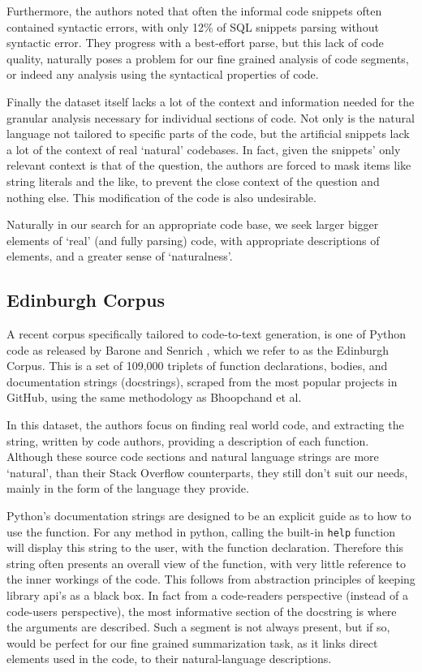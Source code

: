 Furthermore, the authors noted that often the informal code snippets often contained syntactic errors, with only 12\% of SQL snippets parsing without syntactic error. They progress with a best-effort parse, but this
 lack of code quality, naturally poses a problem for our fine grained analysis of code segments, or indeed any analysis using the syntactical properties of code.

Finally the dataset itself lacks a lot of the context and information needed for the granular analysis necessary for individual sections of code. Not only is the natural language not tailored to specific parts of the code, but the artificial snippets lack a lot of the context of real `natural' codebases. In fact, given the snippets' only relevant context is that of the question, the authors are forced to mask items like string literals and the like, to prevent the close context of the question and nothing else. This modification of the code is also undesirable.

Naturally in our search for an appropriate code base, we seek larger bigger elements of `real' (and fully parsing) code, with appropriate descriptions of elements, and a greater sense of `naturalness'.

\subsection{Edinburgh Corpus}

A recent corpus specifically tailored to code-to-text generation, is one of Python code as released by Barone and Senrich \cite{barone_parallel_2017}, which we refer to as the Edinburgh Corpus. 
This is a set of 109,000 triplets of function declarations, bodies, and documentation strings (docstrings), scraped from the most popular projects in GitHub, using the same methodology as Bhoopchand et al. 

In this dataset, the authors focus on finding real world code, and extracting the string, written by code authors, providing a description of each function.
Although these source code sections and natural language strings are more `natural', than their Stack Overflow counterparts, they still don't suit our needs, mainly in the form of the language they provide. 

Python's documentation strings are designed to be an explicit guide as to how to use the function. 
For any method in python, calling the built-in \texttt{help} function will display this string to the user, with the function declaration. 
Therefore this string often presents an overall view of the function, with very little reference to the inner workings of the code. 
This follows from abstraction principles of keeping library api's as a black box.
In fact from a code-readers perspective (instead of a code-users perspective), the most informative section of the docstring is where the arguments are described. 
Such a segment is not always present, but if so, would be perfect for our fine grained summarization task, as it links direct elements used in the code, to their natural-language descriptions. 

